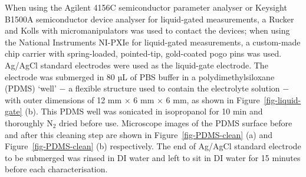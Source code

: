 \documentclass[
  a4paper,
]{scrbook}
\begin{document}
When using the Agilent 4156C semiconductor parameter analyser or
Keysight B1500A semiconductor device analyser for liquid-gated
measurements, a Rucker and Kolls with micromanipulators was used to
contact the devices; when using the National Instruments NI-PXIe for
liquid-gated measurements, a custom-made chip carrier with
spring-loaded, pointed-tip, gold-coated pogo pins was used. Ag/AgCl
standard electrodes were used as the liquid-gate electrode. The
electrode was submerged in 80 µL of PBS buffer in a polydimethylsiloxane
(PDMS) `well' \(-\) a flexible structure used to contain the electrolyte
solution \(-\) with outer dimensions of 12 mm \(\times\) 6 mm \(\times\)
6 mm, as shown in Figure~\ref{fig-liquid-gate} (b). This PDMS well was
sonicated in isopropanol for 10 min and thoroughly N\(_2\) dried before
use. Microscope images of the PDMS surface before and after this
cleaning step are shown in Figure~\ref{fig-PDMS-clean} (a) and
Figure~\ref{fig-PDMS-clean} (b) respectively. The end of Ag/AgCl
standard electrode to be submerged was rinsed in DI water and left to
sit in DI water for 15 minutes before each characterisation.
\end{document}
